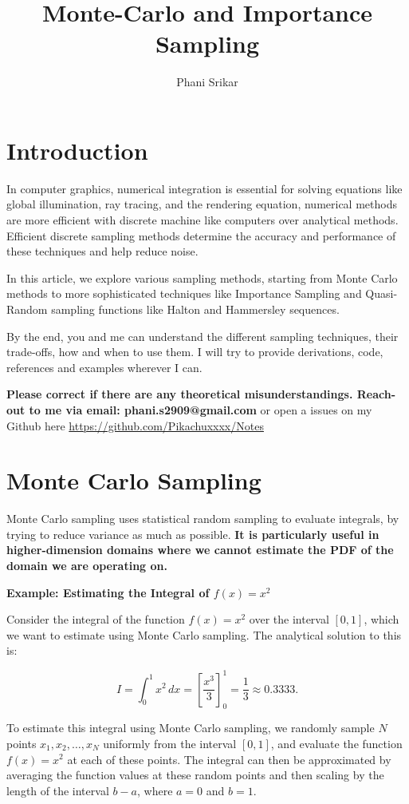 \documentclass{article}
\title{Monte-Carlo and Importance Sampling}
\author{Phani Srikar}
\begin{document}
\maketitle
\section{Introduction}
	In computer graphics, numerical integration is essential for solving equations like global illumination, ray tracing, and the rendering equation, numerical methods are more efficient with discrete machine like computers over analytical methods. Efficient discrete sampling methods determine the accuracy and performance of these techniques and help reduce noise. 
	
	In this article, we explore various sampling methods, starting from Monte Carlo methods to more sophisticated techniques like Importance Sampling and Quasi-Random sampling functions like Halton and Hammersley sequences. 
	
	By the end, you and me can understand the different sampling techniques, their trade-offs, how and when to use them. I will try to provide derivations, code, references and examples wherever I can.
	
\textbf{Please correct if there are any theoretical misunderstandings. Reach-out to me via email: phani.s2909@gmail.com} or open a issues on my Github here \url{https://github.com/Pikachuxxxx/Notes}
\section {Monte Carlo Sampling}

	Monte Carlo sampling uses statistical random sampling to evaluate integrals, by trying to reduce variance as much as possible. \textbf{It is particularly useful in higher-dimension domains where we cannot estimate the PDF of the domain we are operating on.}

\textbf{Example: Estimating the Integral of \( f(x) = x^2 \)}

Consider the integral of the function $ f(x) = x^2 $ over the interval $ [0, 1] $, which we want to estimate using Monte Carlo sampling. The analytical solution to this is:

\[
	I = \int_0^1 x^2 \, dx = \left[ \frac{x^3}{3} \right]_0^1 = \frac{1}{3} \approx 0.3333.
\]

	To estimate this integral using Monte Carlo sampling, we randomly sample $N$ points $ x_1, x_2, \dots, x_N $ uniformly from the interval $[0, 1]$, and evaluate the function $f(x) = x^2$ at each of these points. The integral can then be approximated by averaging the function values at these random points and then scaling by the length of the interval $b - a$, where $a = 0$ and $b = 1$.
\end{document}
